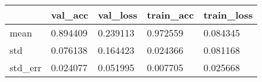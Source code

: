 \begin{tabular}{|l|l|l|l|l|}
\toprule \hline
 & val\_acc & val\_loss & train\_acc & train\_loss \\ \hline
\midrule
mean & 0.894409 & 0.239113 & 0.972559 & 0.084345 \\ \hline
std & 0.076138 & 0.164423 & 0.024366 & 0.081168 \\ \hline
std\_err & 0.024077 & 0.051995 & 0.007705 & 0.025668 \\ \hline
\bottomrule
\end{tabular}
